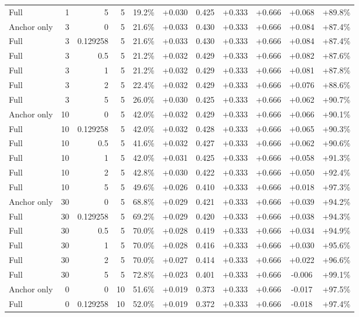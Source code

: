 \begin{table}[htbp]
\begin{tabular}{lrrrccccccc}
Full & 1 & 5 & 5 & 19.2\% & +0.030 & 0.425 & +0.333 & +0.666 & +0.068 & +89.8\% \\
Anchor only & 3 & 0 & 5 & 21.6\% & +0.033 & 0.430 & +0.333 & +0.666 & +0.084 & +87.4\% \\
Full & 3 & 0.129258 & 5 & 21.6\% & +0.033 & 0.430 & +0.333 & +0.666 & +0.084 & +87.4\% \\
Full & 3 & 0.5 & 5 & 21.2\% & +0.032 & 0.429 & +0.333 & +0.666 & +0.082 & +87.6\% \\
Full & 3 & 1 & 5 & 21.2\% & +0.032 & 0.429 & +0.333 & +0.666 & +0.081 & +87.8\% \\
Full & 3 & 2 & 5 & 22.4\% & +0.032 & 0.429 & +0.333 & +0.666 & +0.076 & +88.6\% \\
Full & 3 & 5 & 5 & 26.0\% & +0.030 & 0.425 & +0.333 & +0.666 & +0.062 & +90.7\% \\
Anchor only & 10 & 0 & 5 & 42.0\% & +0.032 & 0.429 & +0.333 & +0.666 & +0.066 & +90.1\% \\
Full & 10 & 0.129258 & 5 & 42.0\% & +0.032 & 0.428 & +0.333 & +0.666 & +0.065 & +90.3\% \\
Full & 10 & 0.5 & 5 & 41.6\% & +0.032 & 0.427 & +0.333 & +0.666 & +0.062 & +90.6\% \\
Full & 10 & 1 & 5 & 42.0\% & +0.031 & 0.425 & +0.333 & +0.666 & +0.058 & +91.3\% \\
Full & 10 & 2 & 5 & 42.8\% & +0.030 & 0.422 & +0.333 & +0.666 & +0.050 & +92.4\% \\
Full & 10 & 5 & 5 & 49.6\% & +0.026 & 0.410 & +0.333 & +0.666 & +0.018 & +97.3\% \\
Anchor only & 30 & 0 & 5 & 68.8\% & +0.029 & 0.421 & +0.333 & +0.666 & +0.039 & +94.2\% \\
Full & 30 & 0.129258 & 5 & 69.2\% & +0.029 & 0.420 & +0.333 & +0.666 & +0.038 & +94.3\% \\
Full & 30 & 0.5 & 5 & 70.0\% & +0.028 & 0.419 & +0.333 & +0.666 & +0.034 & +94.9\% \\
Full & 30 & 1 & 5 & 70.0\% & +0.028 & 0.416 & +0.333 & +0.666 & +0.030 & +95.6\% \\
Full & 30 & 2 & 5 & 70.0\% & +0.027 & 0.414 & +0.333 & +0.666 & +0.022 & +96.6\% \\
Full & 30 & 5 & 5 & 72.8\% & +0.023 & 0.401 & +0.333 & +0.666 & -0.006 & +99.1\% \\
Anchor only & 0 & 0 & 10 & 51.6\% & +0.019 & 0.373 & +0.333 & +0.666 & -0.017 & +97.5\% \\
Full & 0 & 0.129258 & 10 & 52.0\% & +0.019 & 0.372 & +0.333 & +0.666 & -0.018 & +97.4\% \\

\end{tabular}
\end{table}
